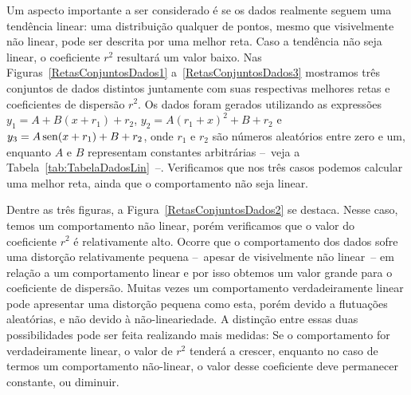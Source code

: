 Um aspecto importante a ser considerado é se os dados realmente seguem uma tendência linear: uma distribuição qualquer de pontos, mesmo que visivelmente não linear, pode ser descrita por uma melhor reta. Caso a tendência não seja linear, o coeficiente $r^2$ resultará um valor baixo. Nas Figuras~\ref{RetasConjuntosDados1} a~\ref{RetasConjuntosDados3} mostramos três conjuntos de dados distintos  juntamente com suas respectivas melhores retas e coeficientes de dispersão $r^2$. Os dados foram gerados utilizando as expressões $y_1 = A + B(x+r_1) + r_2$, $y_2 = A(r_1+x)^2 + B + r_2$ e $y_3 = A\operatorname{sen} (x+r_1) + B + r_2$, onde $r_1$ e $r_2$ são números aleatórios entre zero e um, enquanto $A$ e $B$ representam constantes arbitrárias --~veja a Tabela~\ref{tab:TabelaDadosLin}~--. Verificamos que nos três casos podemos calcular uma melhor reta, ainda que o comportamento não seja linear.

Dentre as três figuras, a Figura~\ref{RetasConjuntosDados2} se destaca. Nesse caso, temos um comportamento não linear, porém verificamos que o valor do coeficiente $r^2$ é relativamente alto. Ocorre que o comportamento dos dados sofre uma distorção relativamente pequena --~apesar de visivelmente não linear~-- em relação a um comportamento linear e por isso obtemos um valor grande para o coeficiente de dispersão. Muitas vezes um comportamento verdadeiramente linear pode apresentar uma distorção pequena como esta, porém devido a flutuações aleatórias, e não devido à não-lineariedade. A distinção entre essas duas possibilidades pode ser feita realizando mais medidas: Se o comportamento for verdadeiramente linear, o valor de $r^2$ tenderá a crescer, enquanto no caso de termos um comportamento não-linear, o valor desse coeficiente deve permanecer constante, ou diminuir.

